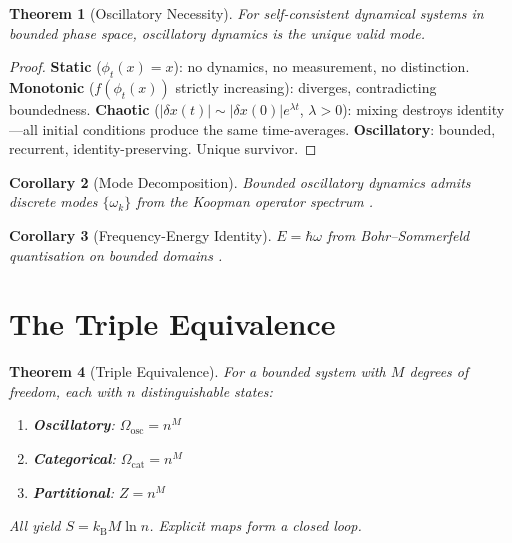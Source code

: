 \documentclass[11pt,twocolumn,a4paper]{article}
\newtheorem{theorem}{Theorem}[section]
\newtheorem{corollary}[theorem]{Corollary}
\theoremstyle{definition}
\theoremstyle{remark}
\newcommand{\kB}{k_{\mathrm{B}}}
\begin{document}
\begin{theorem}[Oscillatory Necessity]
\label{thm:oscillatory}
For self-consistent dynamical systems in bounded phase space, oscillatory dynamics is the unique valid mode.
\end{theorem}

\begin{proof}
\textbf{Static} ($\phi_t(x) = x$): no dynamics, no measurement, no distinction. \textbf{Monotonic} ($f(\phi_t(x))$ strictly increasing): diverges, contradicting boundedness. \textbf{Chaotic} ($|\delta x(t)| \sim |\delta x(0)|e^{\lambda t}$, $\lambda > 0$): mixing destroys identity---all initial conditions produce the same time-averages. \textbf{Oscillatory}: bounded, recurrent, identity-preserving. Unique survivor.
\end{proof}

\begin{corollary}[Mode Decomposition]
Bounded oscillatory dynamics admits discrete modes $\{\omega_k\}$ from the Koopman operator spectrum \citep{koopman1931}.
\end{corollary}

\begin{corollary}[Frequency-Energy Identity]
$E = \hbar\omega$ from Bohr--Sommerfeld quantisation on bounded domains \citep{bohr1913, planck1901}.
\end{corollary}

\section{The Triple Equivalence}
\label{sec:triple}

\begin{theorem}[Triple Equivalence]
\label{thm:triple}
For a bounded system with $M$ degrees of freedom, each with $n$ distinguishable states:
\begin{enumerate}[nosep]
\item \textbf{Oscillatory}: $\Omega_{\mathrm{osc}} = n^M$
\item \textbf{Categorical}: $\Omega_{\mathrm{cat}} = n^M$
\item \textbf{Partitional}: $Z = n^M$
\end{enumerate}
All yield $S = \kB M \ln n$. Explicit maps form a closed loop.
\end{theorem}
\end{document}
